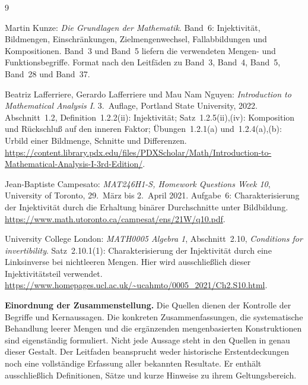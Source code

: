 \renewcommand{\bibname}{Quellen und Bandzuordnung}
\begin{thebibliography}{9}
\footnotesize
\setlength{\itemsep}{4pt}
\setlength{\parskip}{0pt}

Martin Kunze: \emph{Die Grundlagen der Mathematik}.
Band~6: Injektivität, Bildmengen, Einschränkungen,
Zielmengenwechsel, Fallabbildungen und Kompositionen.
Band~3 und Band~5 liefern die verwendeten Mengen- und
Funktionsbegriffe. Format nach den Leitfäden zu
Band~3, Band~4, Band~5, Band~28 und Band~37.

Beatriz Lafferriere, Gerardo Lafferriere und Mau Nam Nguyen:
\emph{Introduction to Mathematical Analysis I}.
3.~Auflage, Portland State University, 2022.
Abschnitt~1.2, Definition~1.2.2(ii): Injektivität;
Satz~1.2.5(ii),(iv): Komposition und Rückschluß auf den
inneren Faktor; Übungen~1.2.1(a) und~1.2.4(a),(b):
Urbild einer Bildmenge, Schnitte und Differenzen.
\url{https://content.library.pdx.edu/files/PDXScholar/Math/Introduction-to-Mathematical-Analysis-I-3rd-Edition/}.

Jean-Baptiste Campesato:
\emph{MAT246H1-S, Homework Questions Week 10},
University of Toronto, 29.~März bis 2.~April 2021.
Aufgabe~6: Charakterisierung der Injektivität durch
die Erhaltung binärer Durchschnitte unter Bildbildung.
\url{https://www.math.utoronto.ca/campesat/ens/21W/q10.pdf}.

University College London:
\emph{MATH0005 Algebra 1}, Abschnitt~2.10,
\emph{Conditions for invertibility}.
Satz~2.10.1(1): Charakterisierung der Injektivität durch
eine Linksinverse bei nichtleeren Mengen.
Hier wird ausschließlich dieser Injektivitätsteil verwendet.
\url{https://www.homepages.ucl.ac.uk/~ucahmto/0005_2021/Ch2.S10.html}.

\end{thebibliography}

\noindent\textbf{Einordnung der Zusammenstellung.}
Die Quellen dienen der Kontrolle der Begriffe und Kernaussagen.
Die konkreten Zusammenfassungen, die systematische Behandlung
leerer Mengen und die ergänzenden mengenbasierten Konstruktionen
sind eigenständig formuliert. Nicht jede Aussage steht in den
Quellen in genau dieser Gestalt. Der Leitfaden beansprucht weder
historische Erstentdeckungen noch eine vollständige Erfassung
aller bekannten Resultate. Er enthält ausschließlich Definitionen,
Sätze und kurze Hinweise zu ihrem Geltungsbereich.